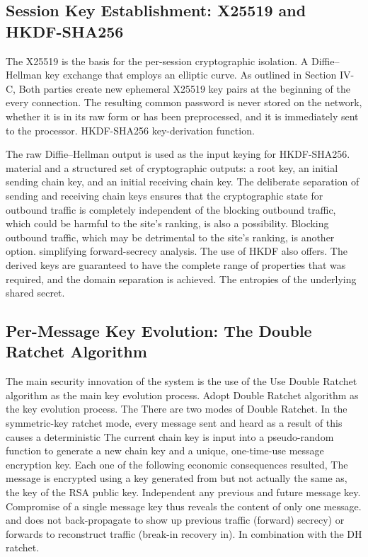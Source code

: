 \documentclass[conference]{IEEEtran}
\begin{document}
\subsection{Session Key Establishment: X25519 and HKDF-SHA256}

The X25519 is the basis for the per-session cryptographic isolation.
A Diffie–Hellman key exchange that employs an elliptic curve.  As outlined in Section IV-C,
Both parties create new ephemeral X25519 key pairs at the beginning of the
every connection.  The resulting common password is never stored on the
network, whether it is in its raw form or has been preprocessed, and it is immediately sent to the processor.
HKDF-SHA256 key-derivation function.

The raw Diffie–Hellman output is used as the input keying for HKDF-SHA256.
material and a structured set of cryptographic outputs: a root key,
an initial sending chain key, and an initial receiving chain key.  The
deliberate separation of sending and receiving chain keys ensures that the
cryptographic state for outbound traffic is completely independent of the
blocking outbound traffic, which could be harmful to the site's ranking, is also a possibility. Blocking outbound traffic, which may be detrimental to the site's ranking, is another option.
simplifying forward-secrecy analysis.  The use of HKDF also offers.
The derived keys are guaranteed to have the complete range of properties that was required, and the domain separation is achieved.
The entropies of the underlying shared secret.

\subsection{Per-Message Key Evolution: The Double Ratchet Algorithm}

The main security innovation of the system is the use of the
Use Double Ratchet algorithm as the main key evolution process. Adopt Double Ratchet algorithm as the key evolution process.  The
There are two modes of Double Ratchet.  In the symmetric-key
ratchet mode, every message sent and heard as a result of this causes a deterministic
The current chain key is input into a
pseudo-random function to generate a new chain key and a
unique, one-time-use message encryption key.  Each one of the following economic consequences resulted,
The message is encrypted using a key generated from but not actually the same as, the key of the RSA public key.
Independent any previous and future message key.  Compromise of a
single message key thus reveals the content of only one message.
and does not back-propagate to show up previous traffic (forward)
secrecy) or forwards to reconstruct traffic (break-in recovery in).
In combination with the DH ratchet.
\end{document}
